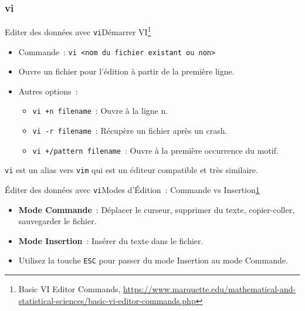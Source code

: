 \documentclass{beamer}
\begin{document}
    \subsubsection{vi}\label{subsubsec:vi}
    \begin{frame}{Editer des données avec \lstinline{vi}}{Démarrer VI\footnote{\label{marquette-vi}Basic VI Editor Commands, \url{https://www.marquette.edu/mathematical-and-statistical-sciences/basic-vi-editor-commands.php}}}
        \begin{itemize}
            \item Commande~: \lstinline{vi <nom du fichier existant ou non>}
            \item Ouvre un fichier pour l'édition à partir de la première ligne.
            \item Autres options~:
            \begin{itemize}
                \item \lstinline{vi +n filename}~: Ouvre à la ligne n.
                \item \lstinline{vi -r filename}~: Récupère un fichier après un crash.
                \item \lstinline{vi +/pattern filename}~: Ouvre à la première occurrence du motif.
            \end{itemize}
        \end{itemize}
        \begin{dangercolorbox}
            \lstinline{vi} est un alias vers \lstinline{vim} qui est un éditeur compatible et très similaire.
        \end{dangercolorbox}
    \end{frame}

    \begin{frame}{Éditer des données avec \lstinline{vi}}{Modes d'Édition~: Commande vs Insertion\cref{marquette-vi}}
        \begin{itemize}
            \item \textbf{Mode Commande}~: Déplacer le curseur, supprimer du texte, copier-coller, sauvegarder le fichier.
            \item \textbf{Mode Insertion}~: Insérer du texte dans le fichier.
            \item Utilisez la touche \lstinline{ESC} pour passer du mode Insertion au mode Commande.
        \end{itemize}
    \end{frame}
\end{document}
